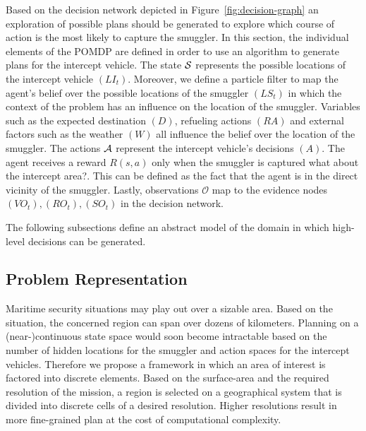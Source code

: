 \documentclass[conference]{IEEEtran}
\begin{document}
Based on the decision network depicted in Figure~\ref{fig:decision-graph} an exploration of possible plans should be generated to explore which course of action is the most likely to capture the smuggler. In this section, the individual elements of the POMDP are defined in order to use an algorithm to generate plans for the intercept vehicle. The state $\S$ represents the possible locations of the intercept vehicle $(LI_t)$. Moreover, we define a particle filter to map the agent's belief over the possible locations of the smuggler $(LS_t)$ in which the context of the problem has an influence on the location of the smuggler. Variables such as the expected destination $(D)$, refueling actions $(RA)$ and external factors such as the weather $(W)$ all influence the belief over the location of the smuggler. The actions $\A$ represent the intercept vehicle's decisions $(A)$. The agent receives a reward $R(s,a)$ only when the smuggler is captured {\red what about the intercept area?}. This can be defined as the fact that the agent is in the direct vicinity of the smuggler. Lastly, observations $\mathcal{O}$ map to the evidence nodes $(VO_t), (RO_t), (SO_t)$ in the decision network.



The following subsections define an abstract model of the domain in which high-level decisions can be generated.

\subsection{Problem Representation}
\label{sub:problem-rep}

Maritime security situations may play out over a sizable area. Based on the situation, the concerned region can span over dozens of kilometers. Planning on a (near-)continuous state space would soon become intractable based on the number of hidden locations for the smuggler and action spaces for the intercept vehicles. Therefore we propose a framework in which an area of interest is factored into discrete elements. Based on the surface-area and the required resolution of the mission, a region is selected on a geographical system that is divided into discrete cells of a desired resolution. Higher resolutions result in more fine-grained plan at the cost of computational complexity.
\end{document}
